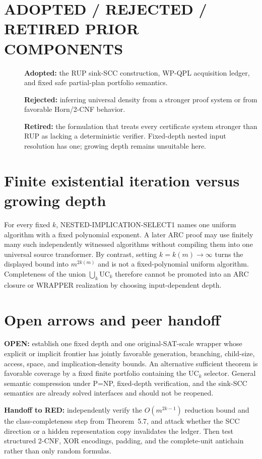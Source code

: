\documentclass[11pt]{article}
\begin{document}
\section*{ADOPTED / REJECTED / RETIRED PRIOR COMPONENTS}
\begin{description}
\item[] \textbf{Adopted:} the RUP sink-SCC construction, WP-QPL acquisition
ledger, and fixed safe partial-plan portfolio semantics.
\item[] \textbf{Rejected:} inferring universal density from a stronger proof
system or from favorable Horn/2-CNF behavior.
\item[] \textbf{Retired:} the formulation that treats every certificate
system stronger than RUP as lacking a deterministic verifier.  Fixed-depth
nested input resolution has one; growing depth remains unsuitable here.
\end{description}

\section*{Finite existential iteration versus growing depth}
For every fixed $k$, NESTED-IMPLICATION-SELECT1 names one uniform algorithm
with a fixed polynomial exponent.  A later ARC proof may use finitely many
such independently witnessed algorithms without compiling them into one
universal source transformer.  By contrast, setting $k=k(m)\to\infty$ turns
the displayed bound into $m^{2k(m)}$ and is not a fixed-polynomial uniform
algorithm.  Completeness of the union $\bigcup_k\mathrm{UC}_k$ therefore
cannot be promoted into an ARC closure or WRAPPER realization by choosing
input-dependent depth.

\section*{Open arrows and peer handoff}
\textbf{OPEN:} establish one fixed depth and one original-SAT-scale wrapper
whose explicit or implicit frontier has jointly favorable generation,
branching, child-size, access, space, and implication-density bounds.  An
alternative sufficient theorem is favorable coverage by a fixed finite
portfolio containing the $\mathrm{UC}_k$ selector.  General semantic
compression under P=NP, fixed-depth verification, and the sink-SCC semantics
are already solved interfaces and should not be reopened.

\textbf{Handoff to RED:} independently verify the $O(m^{2k-1})$ reduction
bound and the class-completeness step from Theorem~5.7, and attack whether
the SCC direction or a hidden representation copy invalidates the ledger.
Then test structured 2-CNF, XOR encodings, padding, and the complete-unit
antichain rather than only random formulas.



\end{document}

